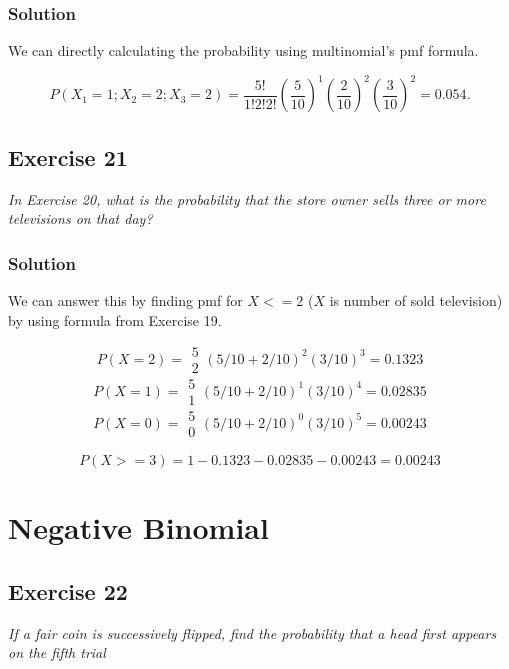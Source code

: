 \documentclass[12pt,a4paper]{article}
\begin{document}
\subsubsection{Solution}

We can directly calculating the probability using multinomial's pmf formula.

\[
P(X_1=1;X_2=2;X_3=2) = \frac{5!}{1!2!2!} (\frac{5}{10})^{1} (\frac{2}{10})^{2} (\frac{3}{10})^{2} = 0.054.
\]


\subsection{Exercise 21}

\textit{In Exercise 20, what is the probability that the store owner sells three or more televisions on that day?}

\subsubsection{Solution}

We can answer this by finding pmf for $X <= 2$ ($X$ is number of sold television) by using formula from Exercise 19.

\[
P(X=2) = \begin{array}{c}5\\2\end{array} (5/10 + 2/10)^{2} (3/10)^{3} = 0.1323
\]
\[
P(X=1) = \begin{array}{c}5\\1\end{array} (5/10 + 2/10)^{1} (3/10)^{4} = 0.02835
\]
\[
P(X=0) = \begin{array}{c}5\\0\end{array} (5/10 + 2/10)^{0} (3/10)^{5} =  0.00243
\]

\[
P(X>=3) = 1 - 0.1323 - 0.02835 - 0.00243 = 0.00243
\]

\section{Negative Binomial}

\subsection{Exercise 22}

\textit{If a fair coin is successively flipped, find the probability that a head first appears on the fifth trial}
\end{document}
